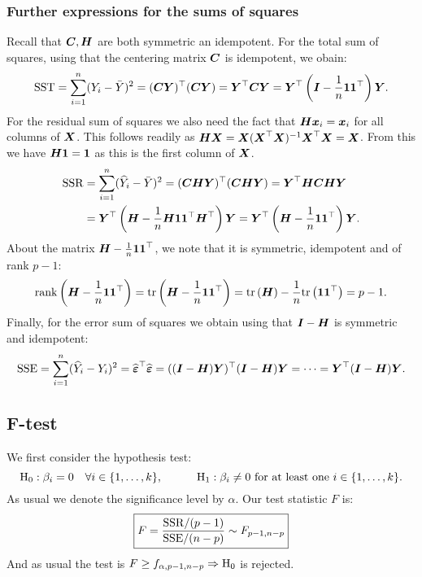 \subsubsection{Further expressions for the sums of squares}
Recall that $\mC, \mH$ are both symmetric an idempotent. For the total sum of squares, using that the centering matrix $\mC$ is idempotent, we obain:
\begin{align*}
    \mr{SST} = \sum_{i=1}^n(Y_i-\bar{Y})^2 = (\mC\Y)^\top(\mC\Y) = \Y^\top \mC \Y = \Y^\top\brac{\mI-\frac{1}{n}\one\one^\top}\Y.
\end{align*}
For the residual sum of squares we also need the fact that $\mH\x_i=\x_i$ for all columns of $\X$. This follows readily as $\mH\X=\X(\X^\top\X)^{-1}\X^\top\X=\X$. From this we have $\mH\one = \one$ as this is the first column of $\X$. 
\begin{align*}
    \mr{SSR} 
    &= \sum_{i=1}^n(\hat{Y}_i-\bar{Y})^2 
    = (\mC\mH\Y)^\top(\mC\mH\Y) 
    = \Y^\top\mH\mC\mH\Y 
    \\&= \Y^\top\brac{\mH-\frac{1}{n}\mH\one\one^\top\mH^\top}\Y 
    = \Y^\top\brac{\mH-\frac{1}{n}\one\one^\top}\Y.
\end{align*}
About the matrix $\mH-\frac{1}{n}\one\one^\top$, we note that it is symmetric, idempotent and of rank $p-1$:
$$
    \rank{\mH-\frac{1}{n}\one\one^\top} = \tr{\mH-\frac{1}{n}\one\one^\top} = \tr{\mH}-\frac{1}{n}\tr{\one\one^\top}=p-1.
$$
Finally, for the error sum of squares we obtain using that $\mI-\mH$ is symmetric and idempotent:
$$
    \mr{SSE} = \sum_{i=1}^n(\hat{Y}_i-Y_i)^2 = \Eh^\top\Eh = ((\mI-\mH)\Y)^\top(\mI-\mH)\Y = \dots = \Y^\top(\mI-\mH)\Y.
$$
\subsection{F-test}
\label{sec:F_test}
We first consider the hypothesis test:
$$
    \mr{H}_0 : \b_i = 0 \quad\forall i\in\{1,\dots,k\},
    \quad\quad\quad
    \mr{H}_1 : \b_i \ne 0 \textrm{ for at least one } i\in\{1,\dots,k\}.
$$
As usual we denote the significance level by $\alpha$. Our test statistic $F$ is:
\begin{align}
    \boxed{F = \frac{\mr{SSR}/(p-1)}{\mr{SSE}/(n-p)} \sim F_{p-1,n-p}}
\end{align}
And as usual the test is $F \geq f_{\alpha, p-1,n-p} \Rightarrow \mr{H}_0$ is rejected.

